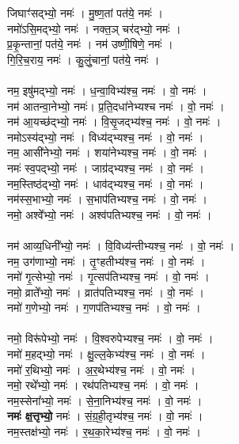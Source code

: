 जिघाꣳ॑सद्भ्यो॒ नमः॑ । मु॒ष्ण॒तां पत॑ये॒ नमः॑ ।\\
नमो॑ऽसि॒मद्भ्यो॒ नमः॑ । नक्त॒ञ् चर॑द्भ्यो॒ नमः॑ ।\\
प्र॒कृ॒न्तानां॒ पत॑ये॒ नमः॑ । नम॑ उष्णी॒षिणे॒ नमः॑ ।\\
गि॒रि॒च॒राय॒ नमः॑ । कु॒लुं॒चानां॒ पत॑ये॒  नमः॑ ।\\
\\
नम॒ इषु॑मद्भ्यो॒  नमः॑ । ध॒न्वा॒विभ्य॑श्च॒  नमः॑ । वो॒  नमः॑ ।\\
नम॑ आतन्वा॒नेभ्यो॒ नमः॑। प्र॒ति॒दधा॑नेभ्यश्च  नमः॑ । वो॒ नमः॑ ।\\
नम॑ आ॒यच्छ॑द्भ्यो॒  नमः॑ ।  वि॒सृ॒जद्भ्य॑श्च॒  नमः॑ ।  वो॒ नमः॑ ।\\
नमोऽस्य॑द्भ्यो॒  नमः॑ । विध्य॑द्भ्यश्च॒  नमः॑ ।  वो॒ नमः॑ ।\\
नम॒ आसी॑नेभ्यो॒  नमः॑ । शया॑नेभ्यश्च॒  नमः॑ । वो॒ नमः॑ ।\\
नमः॑ स्व॒पद्भ्यो॒  नमः॑ । जाग्र॑द्भ्यश्च॒  नमः॑ ।  वो॒ नमः॑ ।\\
नम॒स्तिष्ठ॑द्भ्यो॒  नमः॑ । धाव॑द्भ्यश्च॒  नमः॑ ।  वो॒ नमः॑ ।\\
नम॑स्स॒भाभ्यो॒  नमः॑ । स॒भाप॑तिभ्यश्च॒ नमः॑ । वो॒ नमः॑ ।\\
नमो॒ अश्वे᳚भ्यो॒  नमः॑ । अश्व॑पतिभ्यश्च॒  नमः॑ । वो॒ नमः॑ ।\\
\\
नम॑ आव्य॒धिनी᳚भ्यो॒  नमः॑ । वि॒विध्य॑न्तीभ्यश्च॒  नमः॑ ।  वो॒ नमः॑ ।\\
नम॒ उग॑णाभ्यो॒ नमः॑ । तृ॒ꣳहतीभ्य॑श्च॒ नमः॑ । वो॒ नमः॑ ।\\
नमो॑ गृ॒त्सेभ्यो॒ नमः॑ । गृ॒त्सप॑तिभ्यश्च॒ नमः॑ । वो॒ नमः॑ ।\\
नमो॒ व्राते᳚भ्यो॒ नमः॑ । व्रात॑पतिभ्यश्च॒ नमः॑ । वो॒ नमः॑ ।\\
नमो॑ ग॒णेभ्यो॒ नमः॑ । ग॒णप॑तिभ्यश्च॒ नमः॑ । वो॒ नमः॑ ।\\
\\
नमो॒ विरू॑पेभ्यो॒ नमः॑ । वि॒श्वरुपेभ्यश्च॒ नमः॑ । वो॒ नमः॑ ।\\
नमो॑ म॒हद्भ्यो॒ नमः॑ । क्षु॒ल्ल॒केभ्य॑श्च॒ नमः॑ । वो॒ नमः॑ ।\\
नमो॑ र॒थिभ्यो॒ नमः॑ । अ॒र॒थेभ्य॑श्च॒ नमः॑ । वो॒ नमः॑ ।\\
नमो॒ रथे᳚भ्यो॒ नमः॑ । रथ॑पतिभ्यश्च॒ नमः॑ । वो॒ नमः॑ ।\\
नम॒स्सेना᳚भ्यो॒ नमः॑ । से॒ना॒निभ्य॑श्च॒ नमः॑ । वो॒ नमः॑ ।\\
\textbf{नमः॑ क्ष॒त्तृभ्यो॒} नमः॑ । सं॒ग्र॒ही॒तृभ्य॑श्च॒ नमः॑ । वो॒ नमः॑ ।\\
नम॒स्तक्ष॑भ्यो॒ नमः॑ । र॒थ॒का॒रेभ्य॑श्च॒ नमः॑ । वो॒ नमः॑ ।\\
